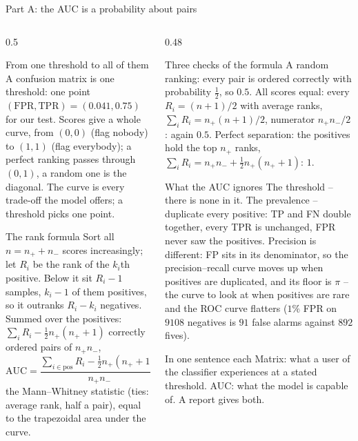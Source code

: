\documentclass[10pt,aspectratio=169]{beamer}
\begin{document}
\begin{frame}{Part A: the AUC is a probability about pairs}
\scriptsize
\begin{columns}[T]
\begin{column}{0.5\textwidth}
\begin{block}{From one threshold to all of them}
A confusion matrix is one threshold: one point
$(\mathrm{FPR},\mathrm{TPR})=(0.041,0.75)$ for our test.  Scores give a
whole curve, from $(0,0)$ (flag nobody) to $(1,1)$ (flag everybody); a
perfect ranking passes through $(0,1)$, a random one is the diagonal.  The
curve is every trade-off the model offers; a threshold picks one point.
\end{block}
\begin{block}{The rank formula}
Sort all $n=n_++n_-$ scores increasingly; let $R_i$ be the rank of the
$k_i$th positive.  Below it sit $R_i-1$ samples, $k_i-1$ of them positives,
so it outranks $R_i-k_i$ negatives.  Summed over the positives:
$\sum_iR_i-\tfrac12n_+(n_++1)$ correctly ordered pairs of $n_+n_-$,
\[
  \mathrm{AUC}=\frac{\sum_{i\in\mathrm{pos}}R_i-\tfrac12n_+(n_++1)}{n_+n_-}
  =\mathrm{Prob}(\text{pos}>\text{neg}),
\]
the Mann--Whitney statistic (ties: average rank, half a pair), equal to
the trapezoidal area under the curve.
\end{block}
\end{column}
\begin{column}{0.48\textwidth}
\begin{block}{Three checks of the formula}
A random ranking: every pair is ordered correctly with probability
$\tfrac12$, so $0.5$.  All scores equal: every $R_i=(n+1)/2$ with average
ranks, $\sum_iR_i=n_+(n+1)/2$, numerator $n_+n_-/2$: again $0.5$.  Perfect
separation: the positives hold the top $n_+$ ranks,
$\sum_iR_i=n_+n_-+\tfrac12n_+(n_++1)$: $1$.
\end{block}
\begin{block}{What the AUC ignores}
The threshold -- there is none in it.  The prevalence -- duplicate every
positive: TP and FN double together, every TPR is unchanged, FPR never saw
the positives.  Precision is different: FP sits in its denominator, so the
precision--recall curve moves up when positives are duplicated, and its
floor is $\pi$ -- the curve to look at when positives are rare and the ROC
curve flatters ($1\%$ FPR on $9108$ negatives is $91$ false alarms against
$892$ fives).
\end{block}
\begin{block}{In one sentence each}
Matrix: what a user of the classifier experiences at a stated threshold.
AUC: what the model is capable of.  A report gives both.
\end{block}
\end{column}
\end{columns}
\end{frame}
\end{document}
